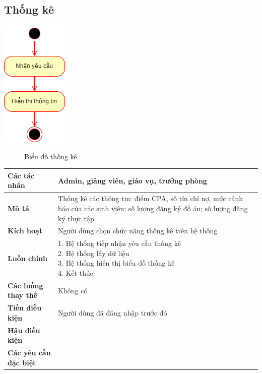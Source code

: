 \subsection{Thống kê} 
  \begin{center}
    \includegraphics[width=.3\textwidth]{../drawio/activity/statistical.png}
    \begin{figure}[h]
      \centering
      \caption{Biểu đồ thống kê}
    \end{figure}
  \end{center}
  \begin{tabular}{|l|l|}
    \hline
    \textbf{Các tác nhân} & Admin, giảng viên, giáo vụ, trưởng phòng \\
    \hline
    \textbf{Mô tả} & Thống kê các thông tin: điểm CPA, số tín chỉ nợ, mức cảnh báo của các sinh viên; số lượng đăng ký đồ án; số lượng đăng ký thực tập\\
    \hline
    \textbf{Kích hoạt} & Người dùng chọn chức năng thống kê trên hệ thống \\
    \hline 
    \textbf{Luồn chính} & \makecell[l]{1. Hệ thống tiếp nhận yêu cầu thống kê \\ 2. Hệ thống lấy dữ liệu \\ 3. Hệ thống hiển thị biểu đồ thống kê \\ 4. Kết thúc} \\
    \hline
    \textbf{Các luồng thay thế} & Không có \\
    \hline
    \textbf{Tiền điều kiện} & Người dùng đã đăng nhập trước đó \\
    \hline
    \textbf{Hậu điều kiện} & \\
    \hline
    \textbf{Các yêu cầu đặc biệt} & \\
    \hline
  \end{tabular}

